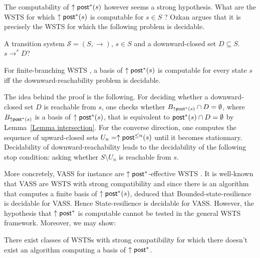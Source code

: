 The computability of $\uparrow \textsf{post}^*(s)$ however seems a strong hypothesis. What are the WSTS for which $\uparrow \textsf{post}^*(s)$ is computable for $s \in S$ ?
Ozkan \cite{DBLP:conf/gg/Ozkan22} argues that it is precisely the WSTS for which the following problem is decidable.

{A transition system $\mathscr{S}=(S,\rightarrow)$, $s \in S$ and a downward-closed set $D
\subseteq S$.}
{$s  \to^* D$? \newline}

\begin{proposition}\label{post*}
For finite-branching WSTS%
, a basis of $\uparrow \textsf{post}^*(s)$ is computable for every state $s$ iff the downward-reachability problem is decidable.
\end{proposition}


The idea behind the proof is the following. For deciding whether a downward-closed set $D$ is reachable from $s$, one checks whether
$B_{\uparrow \textsf{post}^*(s)} \cap D = \emptyset$, 
where $B_{\uparrow \textsf{post}^*(s)}$ is a basis of $\uparrow \textsf{post}^*(s)$,
 that is equivalent to $\textsf{post}^*(s)\cap D = \emptyset$ by
Lemma~\ref{Lemma intersection}. For the converse direction, one computes the sequence of upward-closed sets
$U_n = \uparrow \textsf{post}^{\leq n}(s)$ until it becomes stationnary. 
Decidability of downward-reachability leads to the decidability of the following stop condition:
asking whether $S \setminus U_n$ is reachable from $s$.





More concretely,
VASS for instance are $\uparrow \textsf{post}^*$-effective WSTS \cite{DBLP:journals/corr/abs-2108-00889}. 
It is well-known that 
VASS are WSTS with strong compatibility and since there is an algorithm that computes a finite basis of  $\uparrow \textsf{post}^*(s)$, \cite{DBLP:conf/gg/Ozkan22} deduced that {\sc Bounded-state-resilience} is decidable for VASS.
Hence {\sc State-resilience} is decidable for %
VASS.
However, the hypothesis that $\uparrow \textsf{post}^*$ is computable cannot be tested in the general WSTS framework.  \iffalse Moreover, we may show:

\begin{proposition}
There exist classes of WSTSs with strong 
 compatibility for which there doesn't exist an algorithm computing a basis of $\uparrow \textsf{post}^*$.
\end{proposition}


